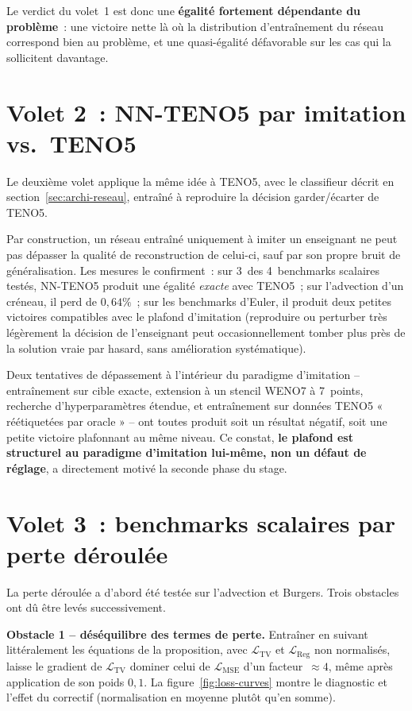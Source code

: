 \documentclass[12pt,a4paper,oneside]{report}
\begin{document}
Le verdict du volet~1 est donc une \textbf{égalité fortement dépendante du
problème}~: une victoire nette là où la distribution d'entraînement du réseau
correspond bien au problème, et une quasi-égalité défavorable sur les cas qui
la sollicitent davantage.

\section{Volet 2~: NN-TENO5 par imitation vs.\ TENO5}
\label{sec:volet2}

Le deuxième volet applique la même idée à TENO5, avec le classifieur décrit en
section~\ref{sec:archi-reseau}, entraîné à reproduire la décision
garder/écarter de TENO5.

Par construction, un réseau entraîné uniquement à imiter un enseignant ne peut
pas dépasser la qualité de reconstruction de celui-ci, sauf par son propre
bruit de généralisation. Les mesures le confirment~: sur 3~des 4~benchmarks
scalaires testés, NN-TENO5 produit une égalité \emph{exacte} avec TENO5~; sur
l'advection d'un créneau, il perd de $0{,}64\%$~; sur les benchmarks d'Euler,
il produit deux petites victoires compatibles avec le plafond d'imitation
(reproduire ou perturber très légèrement la décision de l'enseignant peut
occasionnellement tomber plus près de la solution vraie par hasard, sans
amélioration systématique).

Deux tentatives de dépassement à l'intérieur du paradigme d'imitation --
entraînement sur cible exacte, extension à un stencil WENO7 à 7~points,
recherche d'hyperparamètres étendue, et entraînement sur données TENO5
« réétiquetées par oracle » -- ont toutes produit soit un résultat négatif,
soit une petite victoire plafonnant au même niveau. Ce constat, \textbf{le
plafond est structurel au paradigme d'imitation lui-même, non un défaut de
réglage}, a directement motivé la seconde phase du stage.

\section{Volet 3~: benchmarks scalaires par perte déroulée}
\label{sec:volet3}

La perte déroulée a d'abord été testée sur l'advection et Burgers. Trois
obstacles ont dû être levés successivement.

\textbf{Obstacle 1 -- déséquilibre des termes de perte.} Entraîner en suivant
littéralement les équations de la proposition, avec $\mathcal{L}_{\text{TV}}$
et $\mathcal{L}_{\text{Reg}}$ non normalisés, laisse le gradient de
$\mathcal{L}_{\text{TV}}$ dominer celui de $\mathcal{L}_{\text{MSE}}$ d'un
facteur~$\approx 4$, même après application de son poids $0{,}1$. La
figure~\ref{fig:loss-curves} montre le diagnostic et l'effet du correctif
(normalisation en moyenne plutôt qu'en somme).
\end{document}
